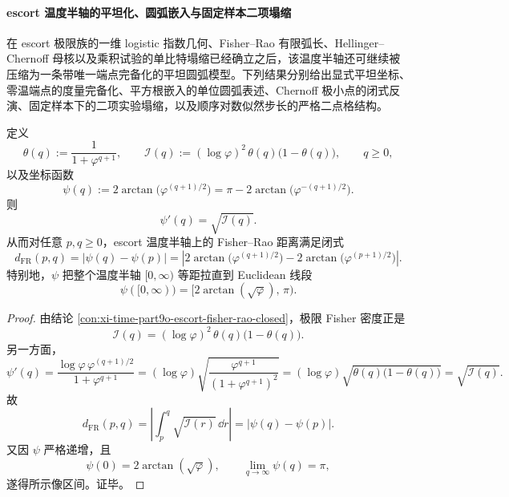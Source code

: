 \paragraph{escort 温度半轴的平坦化、圆弧嵌入与固定样本二项塌缩}
在 escort 极限族的一维 logistic 指数几何、Fisher--Rao 有限弧长、Hellinger--Chernoff 母核以及乘积试验的单比特塌缩已经确立之后，该温度半轴还可继续被压缩为一条带唯一端点完备化的平坦圆弧模型。下列结果分别给出显式平坦坐标、零温端点的度量完备化、平方根嵌入的单位圆弧表述、Chernoff 极小点的闭式反演、固定样本下的二项实验塌缩，以及顺序对数似然步长的严格二点格结构。

\begin{theorem}\label{thm:xi-time-part9sb-escort-fisher-flat-coordinate}
定义
\[
\theta(q):=\frac{1}{1+\varphi^{q+1}},
\qquad
\mathcal I(q):=(\log\varphi)^2\,\theta(q)\bigl(1-\theta(q)\bigr),
\qquad q\ge 0,
\]
以及坐标函数
\[
\psi(q):=2\arctan\!\bigl(\varphi^{(q+1)/2}\bigr)
=
\pi-2\arctan\!\bigl(\varphi^{-(q+1)/2}\bigr).
\]
则
\[
\psi'(q)=\sqrt{\mathcal I(q)}.
\]
从而对任意 \(p,q\ge 0\)，escort 温度半轴上的 Fisher--Rao 距离满足闭式
\[
d_{\mathrm{FR}}(p,q)
=
\left|\psi(q)-\psi(p)\right|
=
\left|
2\arctan\!\bigl(\varphi^{(q+1)/2}\bigr)
-
2\arctan\!\bigl(\varphi^{(p+1)/2}\bigr)
\right|.
\]
特别地，\(\psi\) 把整个温度半轴 \([0,\infty)\) 等距拉直到 Euclidean 线段
\[
\psi([0,\infty))
=
\bigl[2\arctan(\sqrt\varphi),\,\pi\bigr).
\]
\end{theorem}
\begin{proof}
由结论 \ref{con:xi-time-part9o-escort-fisher-rao-closed}，极限 Fisher 密度正是
\[
\mathcal I(q)=(\log\varphi)^2\,\theta(q)\bigl(1-\theta(q)\bigr).
\]
另一方面，
\[
\psi'(q)
=
\frac{\log\varphi\,\varphi^{(q+1)/2}}{1+\varphi^{q+1}}
=
(\log\varphi)\sqrt{\frac{\varphi^{q+1}}{(1+\varphi^{q+1})^2}}
=
(\log\varphi)\sqrt{\theta(q)\bigl(1-\theta(q)\bigr)}
=
\sqrt{\mathcal I(q)}.
\]
故
\[
d_{\mathrm{FR}}(p,q)
=
\left|
\int_p^q \sqrt{\mathcal I(r)}\,\dd r
\right|
=
\left|\psi(q)-\psi(p)\right|.
\]
又因 \(\psi\) 严格递增，且
\[
\psi(0)=2\arctan(\sqrt\varphi),
\qquad
\lim_{q\to\infty}\psi(q)=\pi,
\]
遂得所示像区间。证毕。
\end{proof}

